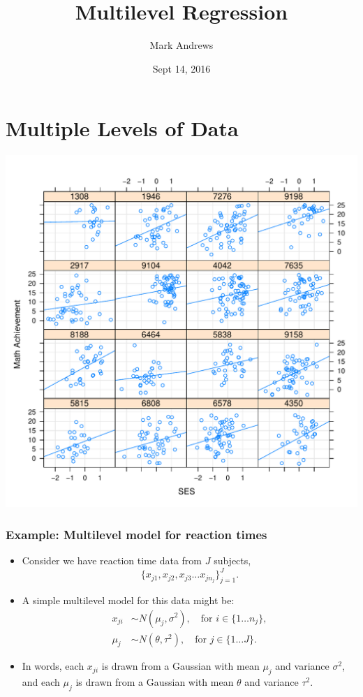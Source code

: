 \documentclass[10pt,xcolor=dvipsnames,serif,professionalfont]{beamer} %
\title[Multilevel Regression]{Multilevel Regression}
\author[Andrews]{Mark Andrews}
\date{Sept 14, 2016}
\begin{document}
{
\begin{frame}
   \titlepage
\end{frame}
}

\section{Multiple Levels of Data}
\begin{frame}
\vspace{-1.5\baselineskip}
\begin{center}
\includegraphics[width=.8\textwidth]{figs/mlplot.pdf}
\end{center}
\end{frame}

\begin{frame}
\frametitle{Example: Multilevel model for reaction times}
\begin{itemize}
\item Consider we have reaction time data from $J$ subjects, 
\[\{x_{j1}, x_{j2}, x_{j3} \ldots x_{jn_j}\}_{j=1}^J.\]
\item A simple multilevel model for this data might be:
\begin{align*}
x_{ji} &\sim N(\mu_j,\sigma^2),\quad\text{for $i \in \{1\ldots n_j\}$},\\
\mu_j &\sim N(\theta,\tau^2), \quad\text{for $j \in \{1 \ldots J\}$}.
\end{align*}
\item In words, each $x_{ji}$ is drawn from a Gaussian with mean $\mu_j$ and variance $\sigma^2$, and each $\mu_j$ is drawn from a Gaussian with mean $\theta$ and variance $\tau^2$.
\end{itemize}
\end{frame}
\end{document}
